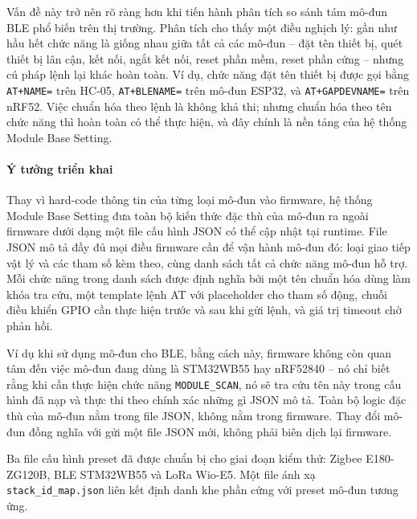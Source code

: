         Vấn đề này trở nên rõ ràng hơn khi tiến hành phân tích so sánh tám mô-đun BLE phổ biến trên thị trường. Phân tích cho thấy một điều nghịch lý: gần như hầu hết chức năng là giống nhau giữa tất cả các mô-đun -- đặt tên thiết bị, quét thiết bị lân cận, kết nối, ngắt kết nối, reset phần mềm, reset phần cứng -- nhưng cú pháp lệnh lại khác hoàn toàn. Ví dụ, chức năng đặt tên thiết bị được gọi bằng \texttt{AT+NAME=} trên HC-05, \texttt{AT+BLENAME=} trên mô-đun ESP32, và \texttt{AT+GAPDEVNAME=} trên nRF52. Việc chuẩn hóa theo lệnh là không khả thi; nhưng chuẩn hóa theo tên chức năng thì hoàn toàn có thể thực hiện, và đây chính là nền tảng của hệ thống Module Base Setting.

        \paragraph{Ý tưởng triển khai}

        Thay vì hard-code thông tin của từng loại mô-đun vào firmware, hệ thống Module Base Setting đưa toàn bộ kiến thức đặc thù của mô-đun ra ngoài firmware dưới dạng một file cấu hình JSON có thể cập nhật tại runtime. File JSON mô tả đầy đủ mọi điều firmware cần để vận hành mô-đun đó: loại giao tiếp vật lý và các tham số kèm theo, cùng danh sách tất cả chức năng mô-đun hỗ trợ. Mỗi chức năng trong danh sách được định nghĩa bởi một tên chuẩn hóa dùng làm khóa tra cứu, một template lệnh AT với placeholder cho tham số động, chuỗi điều khiển GPIO cần thực hiện trước và sau khi gửi lệnh, và giá trị timeout chờ phản hồi.
        
        Ví dụ khi sử dụng mô-đun cho BLE, bằng cách này, firmware không còn quan tâm đến việc mô-đun đang dùng là STM32WB55 hay nRF52840 -- nó chỉ biết rằng khi cần thực hiện chức năng \texttt{MODULE\_SCAN}, nó sẽ tra cứu tên này trong cấu hình đã nạp và thực thi theo chính xác những gì JSON mô tả. Toàn bộ logic đặc thù của mô-đun nằm trong file JSON, không nằm trong firmware. Thay đổi mô-đun đồng nghĩa với gửi một file JSON mới, không phải biên dịch lại firmware.
        
        Ba file cấu hình preset đã được chuẩn bị cho giai đoạn kiểm thử: Zigbee E180-ZG120B, BLE STM32WB55 và LoRa Wio-E5. Một file ánh xạ \texttt{stack\_id\_map.json} liên kết định danh khe phần cứng với preset mô-đun tương ứng.


